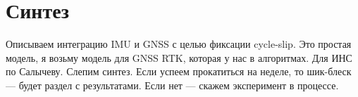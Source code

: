 \section {Синтез}
Описываем интеграцию IMU и GNSS с целью фиксации cycle-slip. Это простая модель, я возьму модель для GNSS RTK, которая у нас в алгоритмах. Для ИНС по Салычеву.  
Слепим синтез. Если успеем прокатиться на неделе, то шик-блеск --- будет раздел с результатами. Если нет --- скажем эксперимент в процессе. 